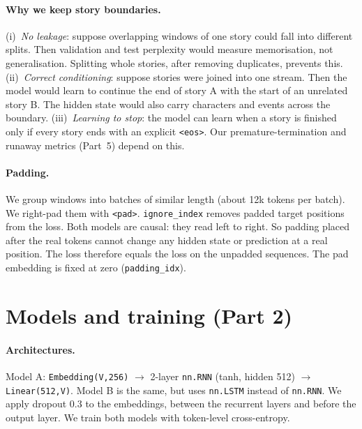 \documentclass[11pt,a4paper]{article}
\begin{document}
\paragraph{Why we keep story boundaries.} (i)~\emph{No leakage}: suppose overlapping windows
of one story could fall into different splits. Then validation and test perplexity would measure
memorisation, not generalisation. Splitting whole stories, after removing duplicates,
prevents this. (ii)~\emph{Correct conditioning}: suppose stories were joined into one stream. Then the
model would learn to continue the end of story A with the start of an unrelated story B. The
hidden state would also carry characters and events across the boundary. (iii)~\emph{Learning to
stop}: the model can learn when a story is finished only if every story ends with an explicit \texttt{<eos>}.
Our premature-termination and runaway metrics (Part~5) depend on this.

\paragraph{Padding.} We group windows into batches of similar length (about 12k tokens per
batch). We right-pad them with \texttt{<pad>}. \texttt{ignore\_index} removes padded target positions
from the loss. Both models are causal: they read left to right. So padding placed after
the real tokens cannot change any hidden state or prediction at a real position. The loss therefore
equals the loss on the unpadded sequences. The pad embedding is fixed at zero
(\texttt{padding\_idx}).

\begin{table}[H]\centering\small
\caption{Data statistics.}\label{tab:data}

\end{table}

\section{Models and training (Part 2)}
\label{sec:models}
\paragraph{Architectures.} Model A: \texttt{Embedding(V,256)} $\rightarrow$ 2-layer
\texttt{nn.RNN} (tanh, hidden 512) $\rightarrow$ \texttt{Linear(512,V)}. Model B is the same, but
uses \texttt{nn.LSTM} instead of \texttt{nn.RNN}. We apply dropout 0.3 to the embeddings, between
the recurrent layers and before the output layer. We train both models with token-level cross-entropy.
\end{document}
